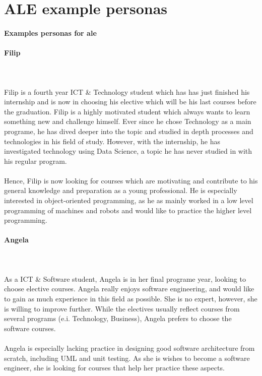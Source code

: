 \chapter{ALE example personas}\label{appendices:personas}

\subsubsection{Examples personas for \acrfull{ale}}
\subsubsection{Filip}\\\\
Filip is a fourth year ICT \& Technology student which has has just finished his internship and is now in choosing his elective which will be his last courses before the graduation. 
Filip is a highly motivated student which always wants to learn something new and challenge himself. 
Ever since he chose Technology as a main programe, he has dived deeper into the topic and studied in depth processes and technologies in his field of study. 
However, with the internship, he has investigated technology using Data Science, a topic he has never studied in with his regular program.\\\\
Hence, Filip is now looking for courses which are motivating and contribute to his general knowledge  and preparation as a young professional. 
He is especially interested in object-oriented programming, as he as mainly worked in a low level programming of machines and robots and would like to practice the higher level programming.
\subsubsection{Angela}\\\\
As a ICT \& Software student, Angela is in her final programe year, looking to choose elective courses. Angela really enjoys software engineering, and would like to gain as much experience in this field as possible. She is no expert, however, she is willing to improve further. While the electives usually reflect courses from several programs (e.i. Technology, Business), Angela prefers to choose the software courses.\\\\
Angela is especially lacking practice in designing good software architecture from scratch, including UML and unit testing. As she is wishes to become a software engineer, she is looking for courses that help her practice these aspects.
